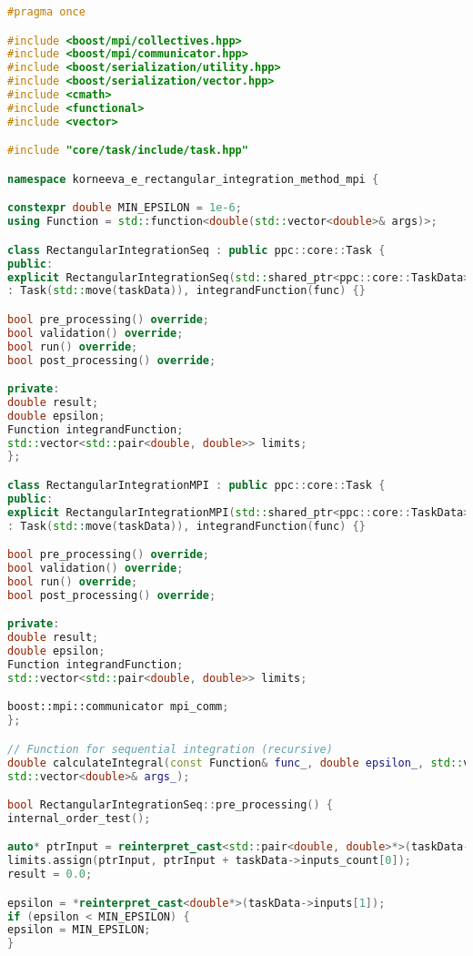 \documentclass[12pt]{article}
\begin{document}
\begin{lstlisting}[language=C++]
#pragma once

#include <boost/mpi/collectives.hpp>
#include <boost/mpi/communicator.hpp>
#include <boost/serialization/utility.hpp>
#include <boost/serialization/vector.hpp>
#include <cmath>
#include <functional>
#include <vector>

#include "core/task/include/task.hpp"

namespace korneeva_e_rectangular_integration_method_mpi {

constexpr double MIN_EPSILON = 1e-6;
using Function = std::function<double(std::vector<double>& args)>;

class RectangularIntegrationSeq : public ppc::core::Task {
public:
explicit RectangularIntegrationSeq(std::shared_ptr<ppc::core::TaskData> taskData, Function& func)
: Task(std::move(taskData)), integrandFunction(func) {}

bool pre_processing() override;
bool validation() override;
bool run() override;
bool post_processing() override;

private:
double result;
double epsilon;
Function integrandFunction;
std::vector<std::pair<double, double>> limits;
};

class RectangularIntegrationMPI : public ppc::core::Task {
public:
explicit RectangularIntegrationMPI(std::shared_ptr<ppc::core::TaskData> taskData, Function& func)
: Task(std::move(taskData)), integrandFunction(func) {}

bool pre_processing() override;
bool validation() override;
bool run() override;
bool post_processing() override;

private:
double result;
double epsilon;
Function integrandFunction;
std::vector<std::pair<double, double>> limits;

boost::mpi::communicator mpi_comm;
};

// Function for sequential integration (recursive)
double calculateIntegral(const Function& func_, double epsilon_, std::vector<std::pair<double, double>>& limits_,
std::vector<double>& args_);

bool RectangularIntegrationSeq::pre_processing() {
internal_order_test();

auto* ptrInput = reinterpret_cast<std::pair<double, double>*>(taskData->inputs[0]);
limits.assign(ptrInput, ptrInput + taskData->inputs_count[0]);
result = 0.0;

epsilon = *reinterpret_cast<double*>(taskData->inputs[1]);
if (epsilon < MIN_EPSILON) {
epsilon = MIN_EPSILON;
}


\end{lstlisting}
\end{document}
